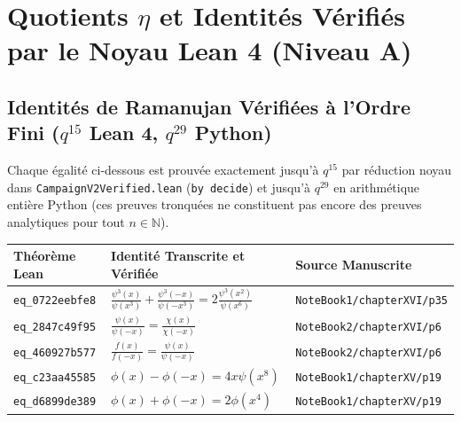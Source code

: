 \documentclass[11pt,twoside,openright]{book}
\begin{document}
\chapter{Quotients $\eta$ et Identités Vérifiés par le Noyau Lean 4 (Niveau A)}
\section{Identités de Ramanujan Vérifiées à l'Ordre Fini ($q^{15}$ Lean 4, $q^{29}$ Python)}
Chaque égalité ci-dessous est prouvée exactement jusqu'à $q^{15}$ par réduction noyau dans \texttt{CampaignV2Verified.lean} (\texttt{by decide}) et jusqu'à $q^{29}$ en arithmétique entière Python (ces preuves tronquées ne constituent pas encore des preuves analytiques pour tout $n \in \mathbb{N}$).
\begin{longtable}{p{2.4cm}p{7.8cm}p{3.6cm}}
\toprule
\textbf{Théorème Lean} & \textbf{Identité Transcrite et Vérifiée} & \textbf{Source Manuscrite} \\
\midrule
\endhead
\texttt{eq\_0722eebfe8} & $\frac{\psi^3(x)}{\psi(x^3)} + \frac{\psi^3(-x)}{\psi(-x^3)} = 2 \frac{\psi^3(x^2)}{\psi(x^6)}$ & \texttt{NoteBook1/chapterXVI/p35} \\
\texttt{eq\_2847c49f95} & $\frac{\psi(x)}{\psi(-x)} = \frac{\chi(x)}{\chi(-x)}$ & \texttt{NoteBook2/chapterXVI/p6} \\
\texttt{eq\_460927b577} & $\frac{f(x)}{f(-x)} = \frac{\psi(x)}{\psi(-x)}$ & \texttt{NoteBook2/chapterXVI/p6} \\
\texttt{eq\_c23aa45585} & $\phi(x) - \phi(-x) = 4x\psi(x^8)$ & \texttt{NoteBook1/chapterXV/p19} \\
\texttt{eq\_d6899de389} & $\phi(x) + \phi(-x) = 2\phi(x^4)$ & \texttt{NoteBook1/chapterXV/p19} \\
\bottomrule
\end{longtable}
\end{document}
